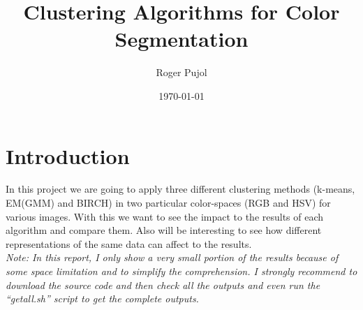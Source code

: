 \documentclass[sigconf,authorversion]{acmart}
\title{Clustering Algorithms for Color Segmentation}
\author{Roger Pujol}
\affiliation{%
  \institution{Universitat Politècnica de Catalunya (UPC)}
  \city{Barcelona}
  \country{Spain}}
\date{\today}
\begin{document}
\maketitle

\section{Introduction}
In this project we are going to apply three different clustering methods (k-means, EM(GMM) and BIRCH) in two particular color-spaces (RGB and HSV) for various images. With this we want to see the impact to the results of each algorithm and compare them. Also will be interesting to see how different representations of the same data can affect to the results.\\
\emph{Note: In this report, I only show a very small portion of the results because of some space limitation and to simplify the comprehension. I strongly recommend to download the source code and then check all the outputs and even run the ``getall.sh'' script to get the complete outputs.}
\end{document}
